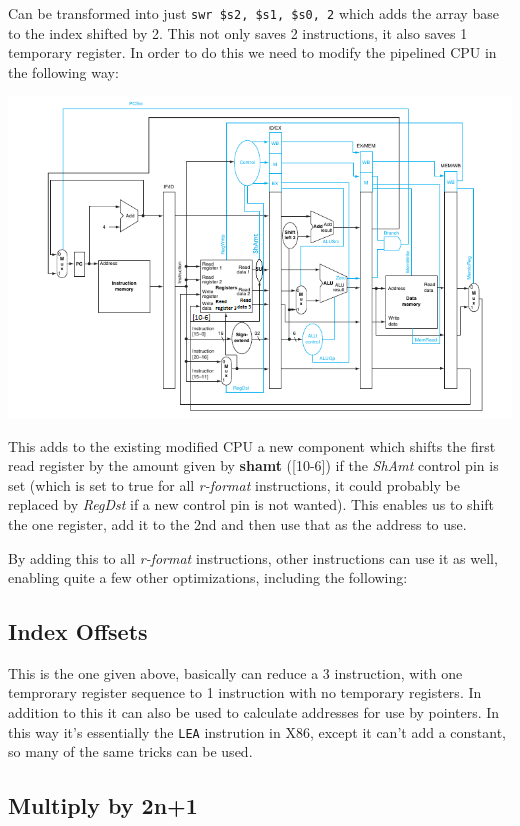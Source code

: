 \documentclass[11pt]{article} %
\newcommand{\strong}[1]{\textbf{#1}}
\newcommand{\code}[1]{\texttt{#1}}
\begin{document}
Can be transformed into just \code{swr \$s2, \$s1, \$s0, 2} which adds the array base to the index shifted by 2. This not only saves 2 instructions, it also saves 1 temporary register. In order to do this we need to modify the pipelined CPU in the following way:

\includegraphics[width=\textwidth]{pipelineCPU5.png}

This adds to the existing modified CPU a new component which shifts the first read register by the amount given by \strong{shamt} ([10-6]) if the \emph{ShAmt} control pin is set (which is set to true for all \emph{r-format} instructions, it could probably be replaced by \emph{RegDst} if a new control pin is not wanted). This enables us to shift the one register, add it to the 2nd and then use that as the address to use.

By adding this to all \emph{r-format} instructions, other instructions can use it as well, enabling quite a few other optimizations, including the following:

\subsection{Index Offsets}

This is the one given above, basically can reduce a 3 instruction, with one temprorary register sequence to 1 instruction with no temporary registers. In addition to this it can also be used to calculate addresses for use by pointers. In this way it's essentially the \code{LEA} instrution in X86, except it can't add a constant, so many of the same tricks can be used.

\subsection{Multiply by 2n+1}
\end{document}
